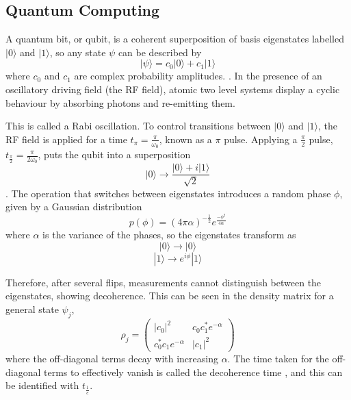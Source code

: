\documentclass{article}
\begin{document}
\begin{multicols*}{2}
\subsection{Quantum Computing}

A quantum bit, or qubit, is a coherent superposition of basis eigenstates labelled $|0\rangle$ and $|1\rangle$, so any state $\psi$ can be described by
\begin{equation}\label{qubit_state}
    |\psi\rangle = c_{0}|0\rangle + c_{1}|1\rangle
\end{equation}
where $c_{0}$ and $c_{1}$ are complex probability amplitudes. \cite{nielsen}.
In the presence of an oscillatory driving field (the RF field), atomic two level systems display a cyclic behaviour by absorbing photons and re-emitting them.

This is called a Rabi oscillation. To control transitions between $|0\rangle$ and $|1\rangle$, the RF field is applied for a time $t_{\pi} = \frac{\pi}{\omega_{0}}$, known as a $\pi$ pulse. Applying a $\frac{\pi}{2}$ pulse, $t_{\frac{\pi}{2}} = \frac{\pi}{2\omega_{0}}$, puts the qubit into a superposition
\begin{equation}\label{superposition}
|0\rangle \longrightarrow \frac{|0\rangle+i|1\rangle}{\sqrt{2}}
\end{equation}
\cite{bellac}. The operation that switches between eigenstates introduces a random phase $\phi$, given by a Gaussian distribution
\begin{equation}\label{phase_gauss}
    p(\phi) = (4\pi\alpha)^{-\frac{1}{2}}e^{\frac{-\phi^{2}}{4\alpha}}
\end{equation}
where $\alpha$ is the variance of the phases, so the eigenstates transform as 
\begin{equation}\label{state_transform_1}
    |0\rangle \longrightarrow |0\rangle 
\end{equation}
\begin{equation}\label{state_transform_2}
    |1\rangle \longrightarrow e^{i\phi}|1\rangle 
\end{equation}


Therefore, after several flips, measurements cannot distinguish between the eigenstates, showing decoherence. This can be seen in the density matrix for a general state $\psi_{j}$,
\begin{equation}\label{density_mat}
    \rho_{j} = \begin{pmatrix}
    |c_{0}|^{2} & c_{0}c_{1}^{*}e^{-\alpha}\\
    c_{0}^{*}c_{1}e^{-\alpha} & |c_{1}|^{2}
    \end{pmatrix}
\end{equation}
where the off-diagonal terms decay with increasing $\alpha$. The time taken for the off-diagonal terms to effectively vanish is called the decoherence time \cite{zurek}, and this can be identified with $t_{\frac{1}{e}}$.


\end{multicols*}
\end{document}
